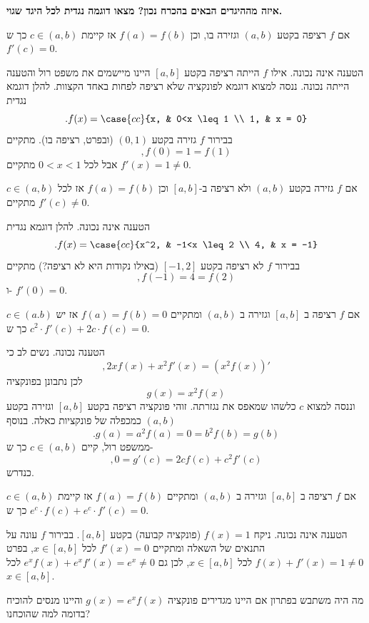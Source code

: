 \textbf{איזה מההיגדים הבאים בהכרח נכון? מצאו דוגמה נגדית לכל היגד שגוי.}
\bE
 \item אם $f$ רציפה בקטע $(a,b)$ וגזירה בו, וכן $f(a)=f(b)$ אז קיימת $c\in(a,b)$ כך ש $f'(c)=0$.
\begin{solbox}
הטענה אינה נכונה.
אילו
$f$
הייתה רציפה בקטע
$[a,b]$
היינו מיישמים את משפט רול והטענה הייתה נכונה. ננסה למצוא דוגמא לפונקציה שלא רציפה לפחות באחד הקצוות.
להלן דוגמא נגדית
$$.f(x) =\case{cc}{x, & 0<x \leq 1 \\ 1, & x = 0}$$
בבירור
$f$
גזירה בקטע
$(0,1)$
(ובפרט, רציפה בו).
מתקיים
$$,f(0)=1=f(1)$$
אבל לכל
$0<x<1$
מתקיים
$f'(x)=1\neq 0$.
\end{solbox}
\item אם $f$ גזירה בקטע $(a,b)$ ולא רציפה ב-$[a,b]$ וכן $f(a)=f(b)$ אז לכל $c\in(a,b)$ מתקיים $f'(c)\neq 0$.
\begin{solbox}
הטענה אינה נכונה. להלן דוגמא נגדית
$$.f(x) =\case{cc}{x^2, & -1<x \leq 2 \\ 4, & x = -1}$$
בבירור
$f$
לא רציפה בקטע
$[-1,2]$
(באילו נקודות היא לא רציפה?)
מתקיים
$$,f(-1)=4=f(2)$$
ו-
$f'(0)=0$.
\end{solbox}

\item אם $f$ רציפה ב $[a,b]$ וגזירה ב $(a,b)$ ומתקיים $f(a)=f(b)=0$ אז יש $c\in(a.b)$ כך ש $c^2\cdot f'(c)+2c\cdot f(c)=0$.
\begin{solbox}
הטענה נכונה.
נשים לב כי
$$,2xf(x)+x^2f'(x)=\left(x^2f(x)\right)'$$
לכן
נתבונן בפונקציה
$$g(x)=x^2f(x)$$
וננסה למצוא
$c$
כלשהו שמאפס את נגזרתה.
זוהי פונקציה רציפה בקטע
$[a,b]$
וגזירה בקטע
$(a,b)$
כמכפלה של פונקציות כאלה.
בנוסף
$$.g(a)=a^2f(a)=0=b^2f(b)=g(b)$$
ממשפט רול, קיים
$c\in(a,b)$
כך ש-
$$,0=g'(c)=2cf(c)+c^2f'(c)$$
כנדרש.
\end{solbox}
\item אם $f$ רציפה ב $[a,b]$ וגזירה ב $(a,b)$ ומתקיים $f(a)=f(b)$ אז קיימת $c\in(a,b)$ כך ש $e^c\cdot f(c)+e^c\cdot f'(c)=0$.
\begin{solbox}
הטענה אינה נכונה.
 ניקח
 $f(x)=1$
 (פונקציה קבועה)
 בקטע
 $[a,b]$.
 בבירור
 $f$
 עונה על התנאים של השאלה ומתקיים
 $f'(x)=0$
 לכל
 $x\in[a,b]$,
 בפרט
 $f(x)+f'(x)=1\neq0$
 לכל
 $x\in[a,b]$,
 לכן גם
 $e^xf(x)+e^xf'(x)=e^x\neq0$
 לכל
 $x\in[a,b]$.

 מה היה משתבש בפתרון אם היינו מגדירים פונקציה
 $g(x)=e^xf(x)$
 והיינו מנסים להוכיח בדומה למה שהוכחנו?
\end{solbox}
\eE
